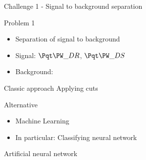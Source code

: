 \begin{frame}{Challenge 1 - Signal to background separation}
\begin{block}{Problem 1}
    \begin{itemize}
        \item Separation of signal to background
        \item Signal: $\tW\_DR$, $\tW\_DS$
        \item Background: \ttbar
    \end{itemize}
\end{block}
\begin{block}{Classic approach}
    Applying cuts
\end{block}
\begin{block}{Alternative}
    \begin{itemize}
        \item Machine Learning
        \item In particular: Classifying neural network
    \end{itemize}
\end{block}
\end{frame}

\begin{frame}[c]
\begin{center}
\Huge Artificial neural network
\end{center}
\end{frame}

